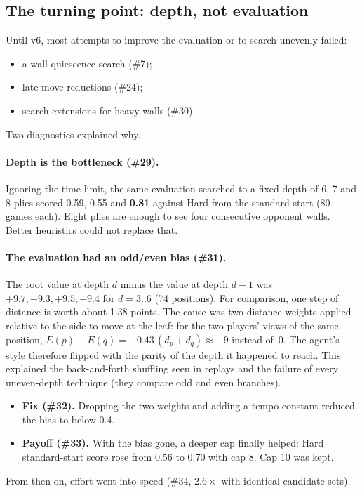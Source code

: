 \subsection{The turning point: depth, not evaluation}
\label{sec:depth}
Until v6, most attempts to improve the evaluation or to search unevenly failed:
\begin{itemize}
  \item a wall quiescence search (\#7);
  \item late-move reductions (\#24);
  \item search extensions for heavy walls (\#30).
\end{itemize}
Two diagnostics explained why.

\paragraph{Depth is the bottleneck (\#29).}
Ignoring the time limit, the same evaluation searched to a fixed depth of 6, 7 and 8 plies scored
0.59, 0.55 and \textbf{0.81} against Hard from the standard start (80 games each). Eight plies are
enough to see four consecutive opponent walls. Better heuristics could not replace that.

\paragraph{The evaluation had an odd/even bias (\#31).}
The root value at depth $d$ minus the value at depth $d-1$ was $+9.7, -9.3, +9.5, -9.4$ for
$d = 3..6$ (74 positions). For comparison, one step of distance is worth about 1.38 points.
The cause was two distance weights applied relative to the side to move at the leaf: for the two
players' views of the same position, $E(p) + E(q) = -0.43\,(d_p + d_q) \approx -9$ instead of~0.
The agent's style therefore flipped with the parity of the depth it happened to reach. This
explained the back-and-forth shuffling seen in replays and the failure of every uneven-depth
technique (they compare odd and even branches).
\begin{itemize}
  \item \textbf{Fix (\#32).} Dropping the two weights and adding a tempo constant reduced the bias
        to below 0.4.
  \item \textbf{Payoff (\#33).} With the bias gone, a deeper cap finally helped: Hard
        standard-start score rose from 0.56 to 0.70 with cap 8. Cap 10 was kept.
\end{itemize}
From then on, effort went into speed (\#34, $2.6\times$ with identical candidate sets).

